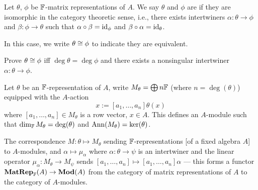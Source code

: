 \begin{definition}
Let $\theta$, $\phi$ be $\mathbb{F}$-matrix representations of $A$. We say
$\theta$ and $\phi$ are  if they are isomorphic in
the category theoretic sense, i.e., there exists intertwiners
$\alpha\colon\theta\to\phi$ and $\beta\colon\phi\to\theta$ such that
$\alpha\circ\beta=\operatorname{id}_{\phi}$ and $\beta\circ\alpha=\operatorname{id}_{\theta}$.

In this case, we write $\theta\cong\phi$ to indicate they are equivalent.
\end{definition}

\begin{xca}
Prove $\theta\cong\phi$ iff $\deg\theta=\deg\phi$ and there exists a
nonsingular intertwiner $\alpha\colon\theta\to\phi$.
\end{xca}

\begin{definition}
Let $\theta$ be an $\mathbb{F}$-representation of $A$, write
$M_{\theta}=\bigoplus n\mathbb{F}$ (where $n=\deg(\theta)$) equipped with the 
$A$-action
\begin{equation}
[a_{1},\dots,a_{n}]x:=[a_{1},\dots,a_{n}]\theta(x)
\end{equation}
where $[a_{1},\dots,a_{n}]\in M_{\theta}$ is a row vector, $x\in A$.
This defines an $A$-module such that
$\dim_{\mathbb{F}}M_{\theta}=\deg(\theta)$ and $\operatorname{Ann}(M_{\theta})=\ker(\theta)$.

The correspondence $M\colon\theta\mapsto M_{\theta}$ sending
$\mathbb{F}$-representations [of a fixed algebra $A$] to $A$-modules, and
$\alpha\mapsto\mu_{\alpha}$ where $\alpha\colon\theta\to\psi$ is an
intertwiner and the linear operator $\mu_{\alpha}\colon M_{\theta}\to M_{\psi}$ sends
$[a_{1},\dots,a_{n}]\mapsto[a_{1},\dots,a_{n}]\alpha$ --- this forms a
functor $\operatorname{\textup{\textbf{MatRep}}}_{\mathbb{F}}(A)\to\operatorname{\textup{\textbf{Mod}}}(A)$ from the category of matrix
representations of $A$ to the category of $A$-modules.
\end{definition}

